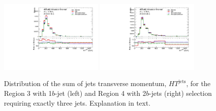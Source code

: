 \begin{figure}[!htb]
\centering
\includegraphics[width=0.45\textwidth]{Plots/ttV/c_Region_2_HT_jets}
\includegraphics[width=0.45\textwidth]{Plots/ttV/c_Region_3_HT_jets}\\
  \caption{Distribution of the sum of jets transverse momentum, $HT^{\text{jets}}$, for the Region 3 with 1$b$-jet (left) and Region 4 with 2$b$-jets (right) selection requiring exactly three jets. Explanation in text. \label{ttV:3j12b}}
\end{figure}


